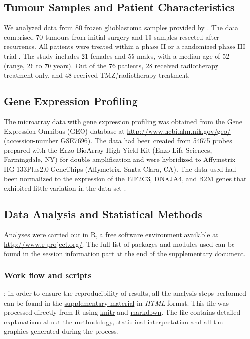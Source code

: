 \documentclass[9pt,twocolumn,twoside]{gsajnl}
\begin{document}
\subsection*{Tumour Samples and Patient Characteristics}

We analyzed data from 80 frozen glioblastoma samples provided by \cite{Murat2008}. The data comprised 70 tumours from initial surgery and 10 samples resected after recurrence. All patients were treated within a phase II or a randomized phase III trial \citep{Stupp2002,Stupp2005}. The study includes 21 females and 55 males, with a median age of 52 (range, 26 to 70 years). Out of the 76 patients, 28 received radiotherapy treatment only, and 48 received TMZ/radiotherapy treatment. 

\subsection*{Gene Expression Profiling}

The microarray data with gene expression profiling was obtained from the Gene Expression Omnibus (GEO) database at \url{http://www.ncbi.nlm.nih.gov/geo/} (accession-number GSE7696). The data had been created from 54675 probes prepared with the Enzo BioArray-High Yield Kit (Enzo Life Sciences, Farmingdale, NY) for double amplification and were hybridized to Affymetrix HG-133Plus2.0 GeneChips (Affymetrix, Santa Clara, CA). The data used had been normalized to the expression of the EIF2C3, DNAJA4, and B2M genes that exhibited little variation in the data set \citep{Murat2008}.

\subsection*{Data Analysis and Statistical Methods}
Analyses were carried out in R, a free software environment available at \url{http://www.r-project.org/}. The full list of packages and modules used can be found in the session information part at the end of the supplementary document. 

\subsubsection*{Work flow and scripts}: in order to ensure the reproducibility of results, all the analysis steps performed can be found in the \href{http://ieoproject.tk/ieo/abella_casals_miravet.html}{supplementary material} in \textit{HTML} format. This file was processed directly from R using 
\href{http://cran.r-project.org/web/packages/knitr/index.html}{knitr} and \href{http://cran.r-project.org/web/packages/markdown/index.html}{markdown}. The file contains detailed explanations about the methodology, statistical interpretation and all the graphics generated during the process. 
\end{document}

